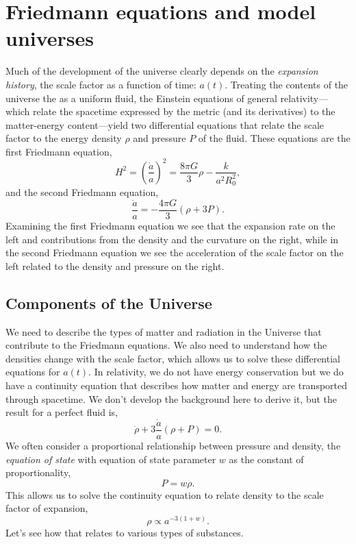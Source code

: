 \section{Friedmann equations and model universes}
Much of the development of the universe clearly depends on the \textit{expansion history}, the scale factor as a function of time: $a(t)$.  Treating the contents of the universe the as a uniform fluid, the Einstein equations of general relativity---which relate the spacetime expressed by the metric (and its derivatives) to the matter-energy content---yield two differential equations that relate the scale factor to the energy density $\rho$ and pressure $P$ of the fluid. These equations are the first Friedmann equation,
\begin{equation}
  H^2 = \left( \frac{\dot a}{a} \right)^2 = \frac{8\pi G}{3} \rho - \frac{k}{a^2 R_0^2}, \label{eqn:friedmann1}
\end{equation}
and the second Friedmann equation,
\begin{equation}
  \frac{\ddot a}{a} = -\frac{4 \pi G}{3} (\rho + 3 P) \label{eqn:friedmann2}.
\end{equation}
Examining the first Friedmann equation we see that the expansion rate on the left and contributions from the density and the curvature on the right, while in the second Friedmann equation we see the acceleration of the scale factor on the left related to the density and pressure on the right.

\subsection{Components of the Universe}
We need to describe the types of matter and radiation in the Universe that contribute to the Friedmann equations.  We also need to understand how the densities change with the scale factor, which allows us to solve these differential equations for $a(t)$.  In relativity, we do not have energy conservation but we do have a continuity equation that describes how matter and energy are transported through spacetime.   We don't develop the background here to derive it, but the result for a perfect fluid is,
\begin{equation}
  \dot \rho + 3 \frac{\dot a}{a}(\rho + P) = 0.
\end{equation}
We often consider a proportional relationship between pressure and density, the \textit{equation of state} with equation of state parameter $w$ as the constant of proportionality,
\begin{equation}
  P = w \rho.
\end{equation}
This allows us to solve the continuity equation to relate density to the scale factor of expansion,
\begin{equation}
  \rho \propto a^{-3(1+w)}.
\end{equation}
Let's see how that relates to various types of substances.


